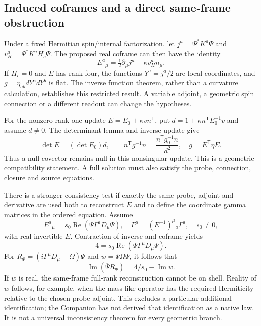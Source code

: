 \documentclass[11pt,a4paper]{article}
\begin{document}
\subsection{Induced coframes and a direct same-frame obstruction}
Under a fixed Hermitian spin/internal factorization, let
$j^a=\Psi^*K^a\Psi$ and
$v_H^a=\Psi^*K^aH_c\Psi$. The proposed real coframe can then
have the identity
\begin{equation}
 E^a{}_{\mu}=\tfrac12\partial_\mu j^a+\kappa v_H^a n_\mu.
\end{equation}
If $H_c=0$ and $E$ has rank four, the functions $Y^a=j^a/2$
are local coordinates, and $g=\eta_{ab}dY^a dY^b$ is flat.
The inverse function theorem, rather than a curvature calculation,
establishes this restricted result. A variable adjoint, a geometric
spin connection or a different readout can change the hypotheses.

For the nonzero rank-one update $E=E_0+\kappa v n^{\mathsf T}$,
put $d=1+\kappa n^{\mathsf T}E_0^{-1}v$ and assume $d\ne0$.
The determinant lemma and inverse update give
\begin{equation}
 \det E=(\det E_0)d,\qquad
 n^{\mathsf T}g^{-1}n=
       \frac{n^{\mathsf T}g_0^{-1}n}{d^2},
 \quad g=E^{\mathsf T}\eta E.
\end{equation}
Thus a null covector remains null in this nonsingular update. This
is a geometric compatibility statement. A full solution must also
satisfy the probe, connection, closure and source equations.

There is a stronger consistency test if exactly the same probe,
adjoint and derivative are used both to reconstruct $E$ and to
define the coordinate gamma matrices in the ordered equation. Assume
\begin{equation}
 E^a{}_{\mu}=s_0\operatorname{Re}(\overline\Psi\Gamma^aD_\mu\Psi),
 \quad \Gamma^\mu=(E^{-1})^\mu{}_a\Gamma^a,\quad s_0\ne0,
\end{equation}
with real invertible $E$. Contraction of inverse and coframe yields
\begin{equation}
 4=s_0\operatorname{Re}(\overline\Psi\Gamma^\mu D_\mu\Psi).
\end{equation}
For $R_\Psi=(i\Gamma^\mu D_\mu-\Omega)\Psi$ and
$w=\overline\Psi\Omega\Psi$, it follows that
\begin{equation}
 \operatorname{Im}(\overline\Psi R_\Psi)=4/s_0-\operatorname{Im}w.
\end{equation}
If $w$ is real, the same-frame full-rank reconstruction cannot be
on shell. Reality of $w$ follows, for example, when the mass-like
operator has the required Hermiticity relative to the chosen probe
adjoint. This excludes a particular additional identification; the
Companion has not derived that identification as a native law. It
is not a universal inconsistency theorem for every geometric branch.
\end{document}
